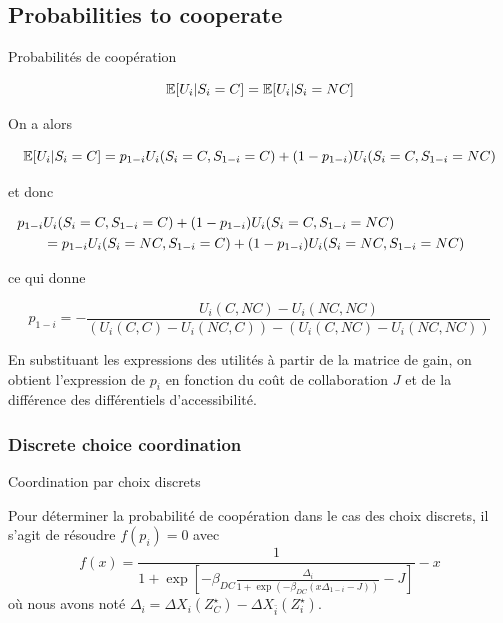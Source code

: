 \subsection{Probabilities to cooperate}{Probabilités de coopération}


\[
\operatorname{\mathbb{E}}\!\left[U_i|S_i=C\right] = \operatorname{\mathbb{E}}\!\left[U_i|S_i=NC\right]
\] 


On a alors

\[
\operatorname{\mathbb{E}}\!\left[U_i|S_i=C\right] = p_{1-i} U_i(S_i=C,S_{1-i}=C) + (1- p_{1-i}) U_i (S_i=C,S_{1-i}=NC)
\]

et donc 

\begin{equation*}
\hspace{-1cm}
\begin{split}
	p_{1-i} & U_i(S_i=C,S_{1-i}=C) + (1- p_{1-i}) U_i (S_i=C,S_{1-i}=NC) \\
	& = p_{1-i} U_i(S_i=NC,S_{1-i}=C) + (1- p_{1-i}) U_i (S_i=NC,S_{1-i}=NC)
\end{split}
\end{equation*}

ce qui donne

\[
p_{1-i} = - \frac{U_i(C,NC) - U_i(NC,NC)}{\left(U_i(C,C) - U_i(NC,C)\right) - \left(U_i(C,NC) - U_i(NC,NC)\right)}
\]

En substituant les expressions des utilités à partir de la matrice de gain, on obtient l'expression de $p_i$ en fonction du coût de collaboration $J$ et de la différence des différentiels d'accessibilité.


\subsubsection{Discrete choice coordination}{Coordination par choix discrets}


Pour déterminer la probabilité de coopération dans le cas des choix discrets, il s'agit de résoudre $f(p_i) = 0$ avec
\[
f(x) = \frac{1}{1+\exp\left[-\beta_{DC}\frac{\Delta_i}{1 + \exp(-\beta_{DC}(x \Delta_{1-i} - J))} - J\right]} - x
\]
où nous avons noté $\Delta_i = \Delta X_{i}(Z^{\star}_{C}) - \Delta X_{\bar{i}}(Z^{\star}_{i})$.


